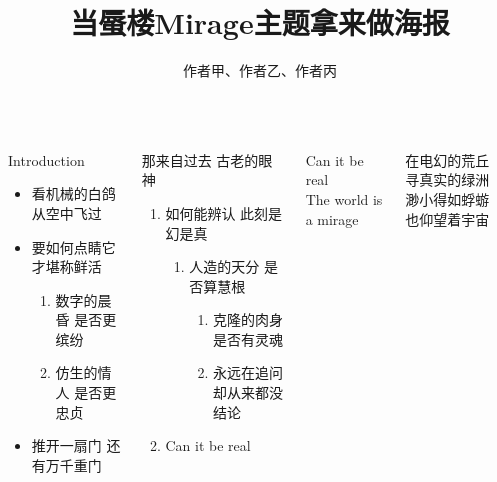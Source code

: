 \documentclass[linespread=1.4]{ctexbeamer}
\title{当蜃楼Mirage主题拿来做海报}
\author{作者甲、作者乙、作者丙}
\begin{document}
\begin{frame}

\begin{columns}[T]
\begin{block}{Introduction}

\begin{itemize}
    \item 看机械的白鸽\faDove{} 从空中飞过 
    \item 要如何点睛\faEye[regular] 它才堪称鲜活

\begin{enumerate}
    \item 数字的晨昏\faCloudSun{} 是否更缤纷\faCloudMoon
    \item 仿生的情人\faGrinHearts{} 是否更忠贞\faGrin*[regular]
\end{enumerate}

    \item 推开一扇门\faDoorOpen{} 还有万千重门\faDoorClosed{\small\faDoorClosed}{\footnotesize\faDoorClosed}{\scriptsize\faDoorClosed}{\tiny\faDoorClosed}
\end{itemize}

\end{block}

\begin{block}{那来自过去 古老的眼神}
    \begin{enumerate}
        \item 如何能辨认 此刻是幻是真
        \begin{enumerate}
	        \item 人造的天分 是否算慧根
	        \begin{enumerate}
		        \item 克隆的肉身 是否有灵魂
		        \item 永远在追问 却从来都没结论
	        \end{enumerate}
        \end{enumerate}
        \item \alert{Can it be real}
    \end{enumerate}
\end{block}

\begin{pullquote}
    Can it be real\\
    The world is a mirage
\end{pullquote}

\bigskip
    
\renewcommand{\MiragePullquoteOpen}{\hskip-.2\ccwd『}
\begin{pullquote}
在电幻的荒丘　寻真实的绿洲\\
渺小得如蜉蝣　也仰望着宇宙
\end{pullquote}


\end{columns}
\end{frame}
\end{document}
